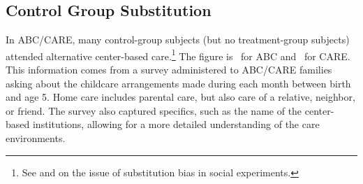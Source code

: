 \subsection{Control Group Substitution}

In ABC/CARE, many control-group subjects (but no treatment-group subjects) attended alternative center-based care.\footnote{See \cite{Heckman_Hohmann_etal_2000_QJE} and \citet{Kline_Walters_2016_QJE} on the issue of substitution bias in social experiments.} The figure is \treatsubsabc\ for ABC and \treatsubscarec\ for CARE. This information comes from a survey administered to ABC/CARE families asking about the childcare arrangements made during each month between birth and age 5. Home care includes parental care, but also care of a relative, neighbor, or friend. The survey also captured specifics, such as the name of the center-based institutions, allowing for a more detailed understanding of the care environments.

